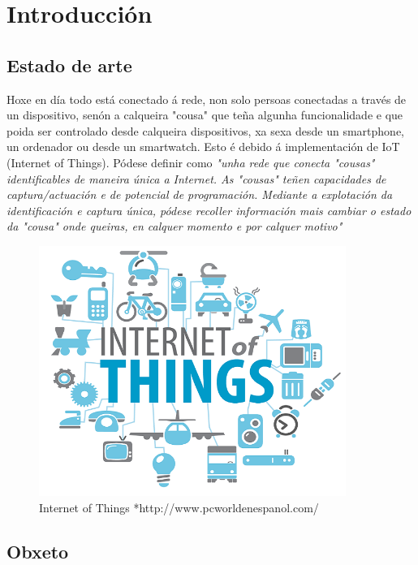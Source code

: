 \documentclass[11pt,twoside]{book}
\begin{document}
\cleardoublepage%

\chapter{Introducción}

\section{Estado de arte}

Hoxe en día todo está conectado á rede, non solo persoas conectadas a través de un dispositivo, senón a calqueira "cousa" que teña algunha funcionalidade e que poida ser controlado desde calqueira dispositivos, xa sexa desde un smartphone, un ordenador ou desde un smartwatch. Esto é debido á implementación de IoT (Internet of Things). Pódese definir como \textit{"unha rede que conecta "cousas" identificables de maneira única a Internet. As "cousas" teñen capacidades de captura/actuación e de potencial de programación. Mediante a explotación  da identificación e captura única, pódese recoller información mais cambiar o estado da "cousa" onde queiras, en calquer momento e por calquer motivo"} \cite{IoT}

\begin{figure}[H]
	\begin{center}
		\includegraphics[width=10cm]{images/IoT.png}
	\end{center}
	\caption{Internet of Things *http://www.pcworldenespanol.com/}
	\label{fig:IoT}
\end{figure}

\section{Obxeto}
\end{document}
